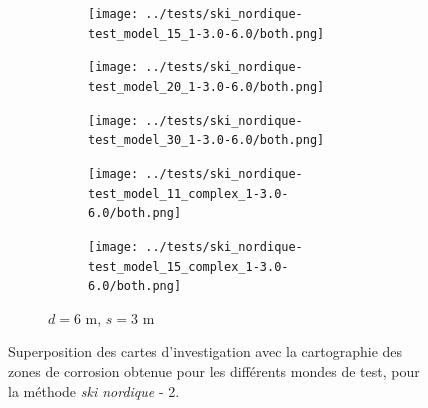 \documentclass[english,RandD]{rapportPFE}  %
\begin{document}
\begin{figure}[H]
\begin{subfigure}[t]{\linewidth}
				\hfill
				\begin{subfigure}[t]{0.11\linewidth}
					\texttt{[image: ../tests/ski\_nordique-test\_model\_15\_1-3.0-6.0/both.png]}
				\end{subfigure}
				\hfill
				\begin{subfigure}[t]{0.11\linewidth}
					\texttt{[image: ../tests/ski\_nordique-test\_model\_20\_1-3.0-6.0/both.png]}
				\end{subfigure}
				\hfill
				\begin{subfigure}[t]{0.11\linewidth}
					\texttt{[image: ../tests/ski\_nordique-test\_model\_30\_1-3.0-6.0/both.png]}
				\end{subfigure}
				\hfill
				\begin{subfigure}[t]{0.11\linewidth}
					\texttt{[image: ../tests/ski\_nordique-test\_model\_11\_complex\_1-3.0-6.0/both.png]}
				\end{subfigure}
				\hfill
				\begin{subfigure}[t]{0.11\linewidth}
					\texttt{[image: ../tests/ski\_nordique-test\_model\_15\_complex\_1-3.0-6.0/both.png]}
				\end{subfigure}
				\caption{$d = 6$ m, $s = 3$ m}
			\end{subfigure}
			\caption{Superposition des cartes d'investigation avec la cartographie des zones de corrosion obtenue pour les différents mondes de test, pour la méthode \textit{ski nordique} - 2.}
			\label{fig:ski_nordique_resultats_2}
		\end{figure}
\end{document}
